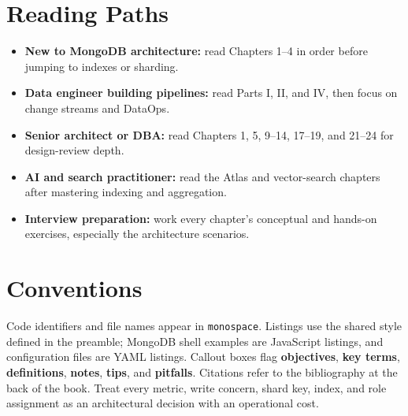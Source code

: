 \section*{Reading Paths}
\begin{itemize}
    \item \textbf{New to MongoDB architecture:} read Chapters 1--4 in order before jumping to indexes or sharding.
    \item \textbf{Data engineer building pipelines:} read Parts I, II, and IV, then focus on change streams and DataOps.
    \item \textbf{Senior architect or DBA:} read Chapters 1, 5, 9--14, 17--19, and 21--24 for design-review depth.
    \item \textbf{AI and search practitioner:} read the Atlas and vector-search chapters after mastering indexing and aggregation.
    \item \textbf{Interview preparation:} work every chapter's conceptual and hands-on exercises, especially the architecture scenarios.
\end{itemize}

\section*{Conventions}
Code identifiers and file names appear in \texttt{monospace}. Listings use the shared style defined in the preamble; MongoDB shell examples are JavaScript listings, and configuration files are YAML listings. Callout boxes flag \textbf{objectives}, \textbf{key terms}, \textbf{definitions}, \textbf{notes}, \textbf{tips}, and \textbf{pitfalls}. Citations refer to the bibliography at the back of the book. Treat every metric, write concern, shard key, index, and role assignment as an architectural decision with an operational cost.
